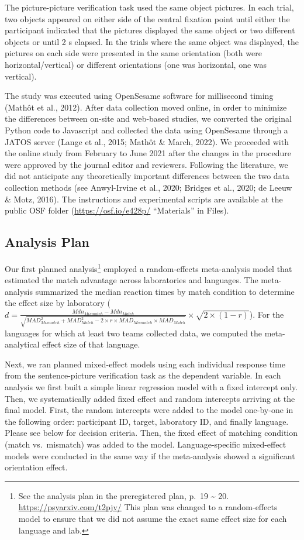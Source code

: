 \documentclass[
  man,floatsintext]{apa7}
\begin{document}
The picture-picture verification task used the same object pictures. In
each trial, two objects appeared on either side of the central fixation
point until either the participant indicated that the pictures displayed
the same object or two different objects or until 2 s elapsed. In the
trials where the same object was displayed, the pictures on each side
were presented in the same orientation (both were horizontal/vertical)
or different orientations (one was horizontal, one was vertical).

The study was executed using OpenSesame software for millisecond timing
(Mathôt et al., 2012). After data collection moved
online, in order to minimize the differences between on-site and
web-based studies, we converted the original Python code to Javascript
and collected the data using OpenSesame through a JATOS server
(Lange et al., 2015; Mathôt \& March, 2022). We proceeded with
the online study from February to June 2021 after the changes in the
procedure were approved by the journal editor and reviewers. Following
the literature, we did not anticipate any theoretically important
differences between the two data collection methods (see Anwyl-Irvine et al., 2020; Bridges et al., 2020; de Leeuw \& Motz, 2016). The instructions and experimental
scripts are available at the public OSF folder (\url{https://osf.io/e428p/}
``Materials'' in Files).

\hypertarget{analysis-plan}{%
\subsection{Analysis Plan}\label{analysis-plan}}

Our first planned analysis\footnote{See the analysis plan in the preregistered plan, p.~19 \textasciitilde{} 20.
  \url{https://psyarxiv.com/t2pjv/} This plan was changed to a
  random-effects model to ensure that we did not assume the exact same
  effect size for each language and lab.} employed a random-effects meta-analysis
model that estimated the match advantage across laboratories and
languages. The meta-analysis summarized the median reaction times by
match condition to determine the effect size by laboratory
(\(d = \frac{Mdn_{Mismatch} - Mdn_{Match}}{\sqrt{MAD_{Mismatch}^2 + MAD_{Match}^2-2\times r\times MAD_{Mismatch} \times MAD_{Match}}} \times \sqrt{2 \times (1-r)}\)).
For the languages for which at least two teams collected data, we
computed the meta-analytical effect size of that language.

Next, we ran planned mixed-effect models using each individual response
time from the sentence-picture verification task as the dependent
variable. In each analysis we first built a simple linear regression
model with a fixed intercept only. Then, we systematically added fixed
effect and random intercepts arriving at the final model. First, the
random intercepts were added to the model one-by-one in the following
order: participant ID, target, laboratory ID, and finally language.
Please see below for decision criteria. Then, the fixed effect of
matching condition (match vs.~mismatch) was added to the model.
Language-specific mixed-effect models were conducted in the same way if
the meta-analysis showed a significant orientation effect.
\end{document}
